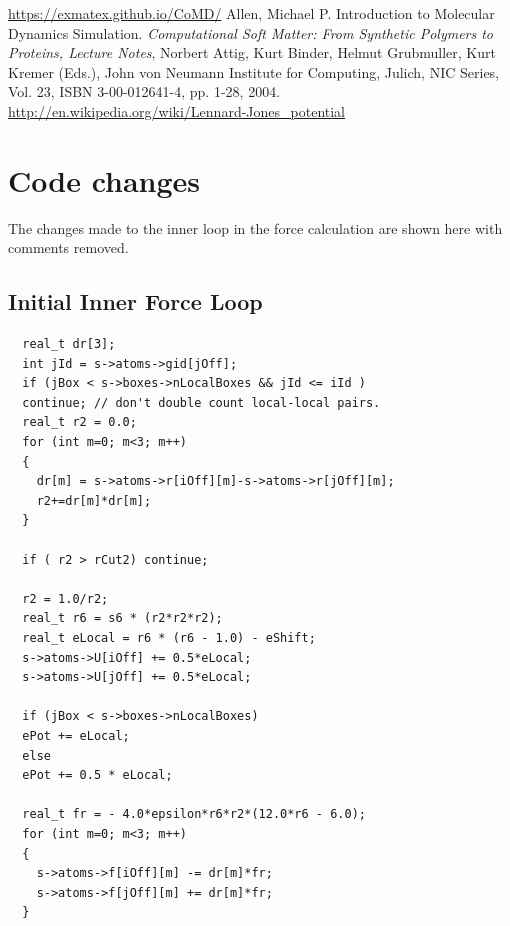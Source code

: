\documentclass[12pt]{article}
\begin{document}
\begin{thebibliography}{}
 \url{https://exmatex.github.io/CoMD/}
     Allen, Michael P. Introduction to Molecular Dynamics Simulation. 
      {\it Computational Soft Matter: From Synthetic Polymers to Proteins, Lecture Notes}, 
      Norbert Attig, Kurt Binder, Helmut Grubmuller, Kurt Kremer (Eds.),
      John von Neumann Institute for Computing, Julich,
      NIC Series, Vol. 23, ISBN 3-00-012641-4, pp. 1-28, 2004.
       \url{http://en.wikipedia.org/wiki/Lennard-Jones_potential}
\end{thebibliography}

\appendix
\section{Code changes}
\label{apd:code-changes}
The changes made to the inner loop in the force calculation are shown
here with comments removed.

\subsection{Initial Inner Force Loop}
\begin{lstlisting}
  real_t dr[3];
  int jId = s->atoms->gid[jOff];  
  if (jBox < s->boxes->nLocalBoxes && jId <= iId )
  continue; // don't double count local-local pairs.
  real_t r2 = 0.0;
  for (int m=0; m<3; m++)
  {
    dr[m] = s->atoms->r[iOff][m]-s->atoms->r[jOff][m];
    r2+=dr[m]*dr[m];
  }

  if ( r2 > rCut2) continue;

  r2 = 1.0/r2;
  real_t r6 = s6 * (r2*r2*r2);
  real_t eLocal = r6 * (r6 - 1.0) - eShift;
  s->atoms->U[iOff] += 0.5*eLocal;
  s->atoms->U[jOff] += 0.5*eLocal;

  if (jBox < s->boxes->nLocalBoxes)
  ePot += eLocal;
  else
  ePot += 0.5 * eLocal;

  real_t fr = - 4.0*epsilon*r6*r2*(12.0*r6 - 6.0);
  for (int m=0; m<3; m++)
  {
    s->atoms->f[iOff][m] -= dr[m]*fr;
    s->atoms->f[jOff][m] += dr[m]*fr;
  }
\end{lstlisting}
\end{document}

